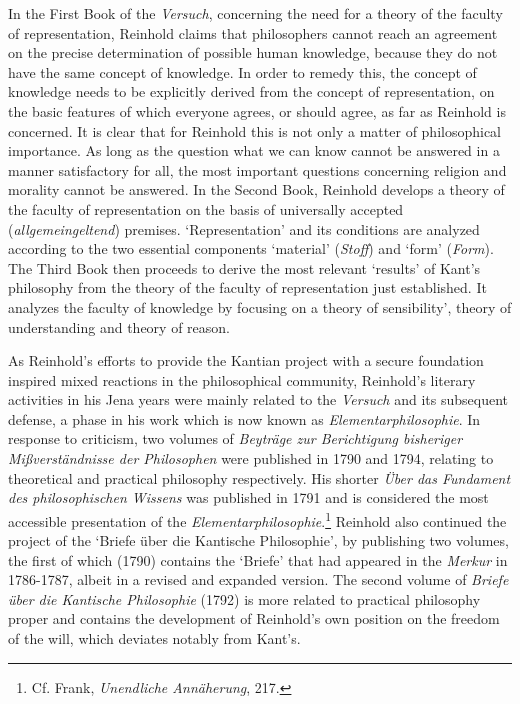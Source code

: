  In the First Book of the \textit{Versuch}, concerning the need for a theory of the faculty of representation, Reinhold claims that philosophers cannot reach an agreement on the precise determination of possible human knowledge, because they do not have the same concept of knowledge. In order to remedy this, the concept of knowledge needs to be explicitly derived from the concept of representation, on the basic features of which everyone agrees, or should agree, as far as Reinhold is concerned. It is clear that for Reinhold this is not only a matter of philosophical importance. As long as the question what we can know cannot be answered in a manner satisfactory for all, the most important questions concerning religion and morality cannot be answered. In the Second Book, Reinhold develops a theory of the faculty of representation on the basis of universally accepted (\textit{allgemeingeltend}) premises. `Representation' and its conditions are analyzed according to the two essential components `material' (\textit{Stoff}) and `form' (\textit{Form}). The Third Book then proceeds to derive the most relevant `results' of Kant's philosophy from the theory of the faculty of representation just established. It analyzes the faculty of knowledge by focusing on a theory of sensibility', theory of understanding and theory of reason.

 As Reinhold's efforts to provide the Kantian project with a secure foundation inspired mixed reactions in the philosophical community, Reinhold's literary activities in his Jena years were mainly related to the \textit{Versuch }and its subsequent defense, a phase in his work which is now known as \textit{Elementarphilosophie}. In response to criticism, two volumes of \textit{Beytr\"{a}ge zur Berichtigung bisheriger Mi\ss{}verst\"{a}ndnisse der Philosophen }were published in 1790 and 1794, relating to theoretical and practical philosophy respectively. His shorter \textit{\"{U}ber das Fundament des philosophischen Wissens} was published in 1791 and is considered the most accessible presentation of the \textit{Elementarphilosophie}.\footnote{ Cf. Frank, \textit{Unendliche Ann\"{a}herung}, 217. } Reinhold also continued the project of the `Briefe \"{u}ber die Kantische Philosophie', by publishing two volumes, the first of which (1790) contains the `Briefe' that had appeared in the \textit{Merkur} in 1786{-}1787, albeit in a revised and expanded version. The second volume of \textit{Briefe \"{u}ber die Kantische Philosophie} (1792) is more related to practical philosophy proper and contains the development of Reinhold's own position on the freedom of the will, which deviates notably from Kant's.

